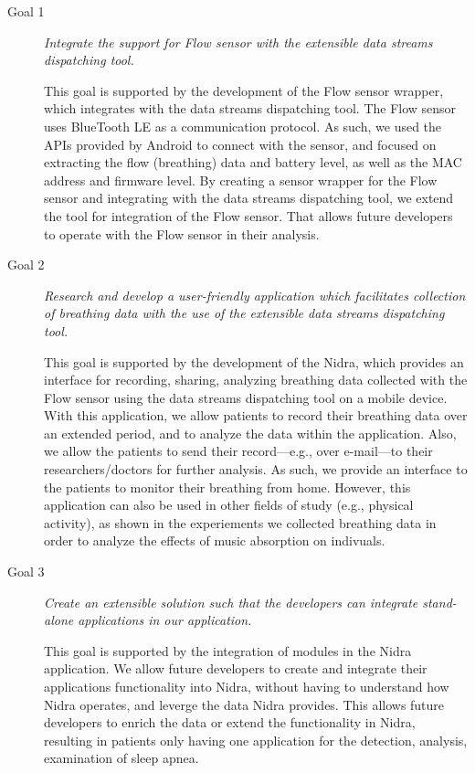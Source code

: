 \begin{description}
    \item[Goal 1] \textit{Integrate the support for Flow sensor with the extensible data streams dispatching tool.}

    This goal is supported by the development of the Flow sensor wrapper, which integrates with the data streams dispatching tool. The Flow sensor uses BlueTooth LE as a communication protocol. As such, we used the APIs provided by Android to connect with the sensor, and focused on extracting the flow (breathing) data and battery level, as well as the MAC address and firmware level. By creating a sensor wrapper for the Flow sensor and integrating with the data streams dispatching tool, we extend the tool for integration of the Flow sensor. That allows future developers to operate with the Flow sensor in their analysis.


    \item[Goal 2] \textit{Research and develop a user-friendly application which facilitates collection of breathing data with the use of the extensible data streams dispatching tool.}

    This goal is supported by the development of the Nidra, which provides an interface for recording, sharing, analyzing breathing data collected with the Flow sensor using the data streams dispatching tool on a mobile device. With this application, we allow patients to record their breathing data over an extended period, and to analyze the data within the application. Also, we allow the patients to send their record---e.g., over e-mail---to their researchers/doctors for further analysis. As such, we provide an interface to the patients to monitor their breathing from home. However, this application can also be used in other fields of study (e.g., physical activity), as shown in the experiements we collected breathing data in order to analyze the effects of music absorption on indivuals.
    
    \item[Goal 3] \textit{Create an extensible solution such that the developers can integrate stand-alone applications in our application.}

    This goal is supported by the integration of modules in the Nidra application. We allow future developers to create and integrate their applications functionality into Nidra, without having to understand how Nidra operates, and leverge the data Nidra provides. This allows future developers to enrich the data or extend the functionality in Nidra, resulting in patients only having one application for the detection, analysis, examination of sleep apnea. 
\end{description}


